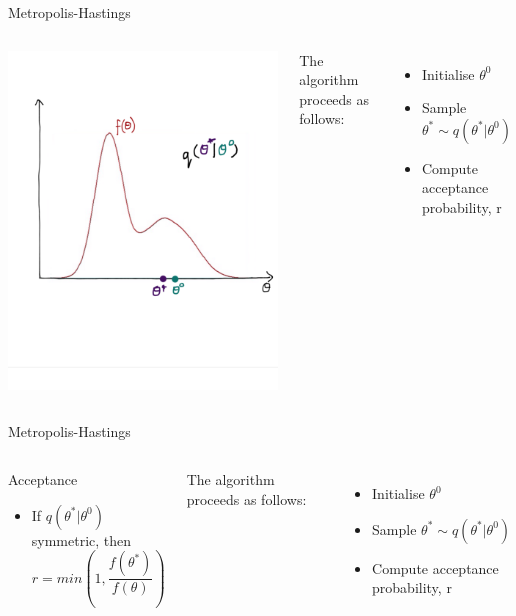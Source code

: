 \documentclass[compress]{beamer}
\begin{document}
\begin{frame}[label=sec-7-4]{Metropolis-Hastings}
\begin{columns}[c] 
\includegraphics[width=0.8\linewidth]{MH2}

The algorithm proceeds as follows:\\
\begin{itemize}
\item Initialise $\theta^{0}$
\item Sample $\theta^* \sim q(\theta^*|\theta^{0})$
\item Compute acceptance probability, r

\end {itemize}
\end{columns}
\end{frame}

\begin{frame}[label=sec-7-5]{Metropolis-Hastings}
\begin{columns}[c] 
\begin{block}{Acceptance}
\begin{itemize}
\item If $q(\theta^*|\theta^{0})$ symmetric, then 
$$ r = min(1,\dfrac{f(\theta^*)}{f(\theta)})$$
\end{itemize}
\end{block}

The algorithm proceeds as follows:\\
\begin{itemize}
\item Initialise $\theta^{0}$
\item Sample $\theta^* \sim q(\theta^*|\theta^{0})$
\item Compute acceptance probability, r
\end{itemize}
\end{columns}
\end{frame}
\end{document}
